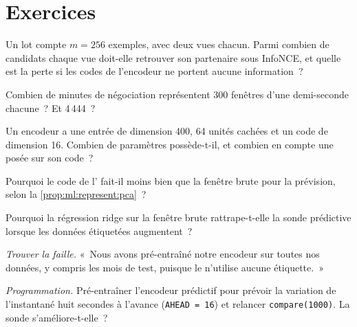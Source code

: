 \section{Exercices}

\begin{exercise}[$\star$]\label{exo:ml:representation-learning:1}
Un lot compte $m = 256$ exemples, avec deux vues chacun. Parmi combien de candidats chaque vue doit-elle retrouver son partenaire sous InfoNCE,
et quelle est la perte si les codes de l'encodeur ne portent aucune information~?
\end{exercise}

\begin{exercise}[$\star$]\label{exo:ml:representation-learning:2}
Combien de minutes de négociation représentent 300 fenêtres d'une demi-seconde chacune~? Et 4\,444~?
\end{exercise}

\begin{exercise}[$\star$]\label{exo:ml:representation-learning:3}
Un encodeur a une entrée de dimension 400, 64 unités cachées et un code de dimension 16. Combien de paramètres possède-t-il, et combien
en compte une  posée sur son code~?
\end{exercise}

\begin{exercise}[$\star\star$]\label{exo:ml:representation-learning:4}
Pourquoi le code de l' fait-il moins bien que la fenêtre brute pour la prévision, selon la \cref{prop:ml:represent:pca}~?
\end{exercise}

\begin{exercise}[$\star\star$]\label{exo:ml:representation-learning:5}
Pourquoi la régression ridge sur la fenêtre brute rattrape-t-elle la sonde prédictive lorsque les données étiquetées augmentent~?
\end{exercise}

\begin{exercise}[$\star\star$]\label{exo:ml:representation-learning:6}
\emph{Trouver la faille.} «~Nous avons pré-entraîné notre encodeur sur toutes nos données, y compris les mois de test, puisque le  n'utilise aucune
étiquette.~»
\end{exercise}

\begin{exercise}[$\star\star\star$]\label{exo:ml:representation-learning:7}
\emph{Programmation.} Pré-entraîner l'encodeur prédictif pour prévoir la variation de l'instantané huit secondes à l'avance (\texttt{AHEAD = 16})
et relancer \texttt{compare(1000)}. La sonde s'améliore-t-elle~?
\end{exercise}

